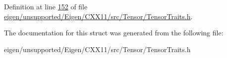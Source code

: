 Definition at line \hyperlink{eigen_2unsupported_2_eigen_2_c_x_x11_2src_2_tensor_2_tensor_traits_8h_source_l00152}{152} of file \hyperlink{eigen_2unsupported_2_eigen_2_c_x_x11_2src_2_tensor_2_tensor_traits_8h_source}{eigen/unsupported/\+Eigen/\+C\+X\+X11/src/\+Tensor/\+Tensor\+Traits.\+h}.



The documentation for this struct was generated from the following file\+:\begin{DoxyCompactItemize}
\item 
eigen/unsupported/\+Eigen/\+C\+X\+X11/src/\+Tensor/\+Tensor\+Traits.\+h\end{DoxyCompactItemize}
